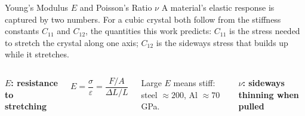 \begin{frame}{Young's Modulus $E$ and Poisson's Ratio $\nu$}
\centering\small
A material's elastic response is captured by two numbers. For a cubic
crystal both follow from the stiffness constants $C_{11}$ and $C_{12}$,
the quantities this work predicts:
$C_{11}$ is the stress needed to stretch the crystal along one axis;
$C_{12}$ is the sideways stress that builds up while it stretches.

\medskip
\begin{columns}[c]

\centering
\textbf{$E$: resistance to stretching}

\smallskip
{}

\smallskip
$E = \dfrac{\sigma}{\varepsilon} = \dfrac{F/A}{\Delta L/L}$

\smallskip
{\scriptsize Large $E$ means stiff: steel $\approx 200$, Al $\approx 70$\,GPa.}

\centering
\textbf{$\nu$: sideways thinning when pulled}


\end{columns}
\end{frame}
